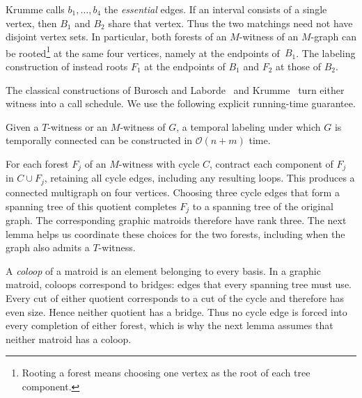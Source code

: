 \documentclass[USenglish, a4paper, thm-restate,numberwithinsect, cleveref]{lipics-v2021}
\newcommand{\Oh}{\mathcal{O}}
\begin{document}
Krumme calls $b_1,\ldots,b_4$ the \emph{essential} edges.
If an interval consists of a single vertex, then $B_1$ and $B_2$
share that vertex. Thus the two matchings need not have disjoint
vertex sets.
In particular, both forests of an $M$-witness of an $M$-graph can be
rooted\footnote{Rooting a forest means choosing one vertex as the root of each tree component.} at the same four vertices, namely at the endpoints of~$B_1$.
The
labeling construction of  instead roots
$F_1$ at the endpoints of $B_1$ and $F_2$ at those of $B_2$.

The classical constructions of Burosch and Laborde~\cite[Lemmas~7--8]{BuroschL92}
and Krumme~\cite[Theorem~3]{Krumme96} turn either witness into a call
schedule. We use the following explicit running-time guarantee.

\begin{lemma}
\label{lem:construct-labeling}
Given a $T$-witness or an $M$-witness of $G$, a temporal labeling under
which $G$ is temporally connected can be constructed in $\Oh(n+m)$ time.
\end{lemma}


For each forest $F_j$ of an $M$-witness with cycle $C$, contract each
component of $F_j$ in $C\cup F_j$, retaining all cycle edges, including
any resulting loops. This produces a connected multigraph on four
vertices. Choosing three cycle edges that form a spanning tree of this
quotient completes $F_j$ to a spanning tree of the original graph.
The corresponding graphic matroids therefore have
rank three. The next lemma helps us coordinate these choices for the
two forests, including when the graph also admits a $T$-witness.

A \emph{coloop} of a matroid is an element belonging to every basis.
In a graphic matroid, coloops correspond to bridges: edges that every
spanning tree must use. Every cut of either quotient corresponds to a
cut of the cycle and therefore has even size. Hence neither quotient
has a bridge. Thus no cycle edge is
forced into every completion of either forest, which is why the next
lemma assumes that neither matroid has a coloop.
\end{document}
